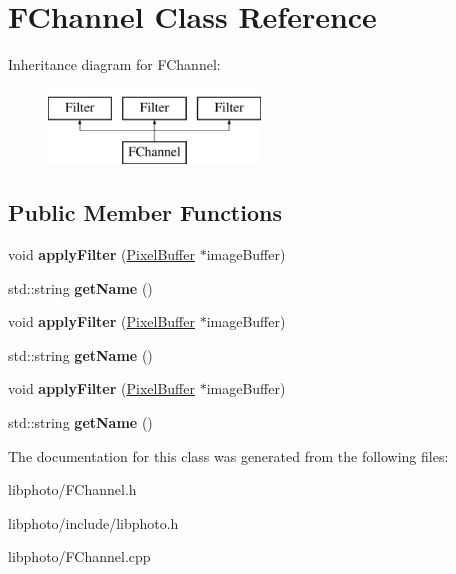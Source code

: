 \hypertarget{classFChannel}{\section{F\-Channel Class Reference}
\label{classFChannel}
}
Inheritance diagram for F\-Channel\-:\begin{figure}[H]
\begin{center}
\leavevmode
\includegraphics[height=2.000000cm]{classFChannel}
\end{center}
\end{figure}
\subsection*{Public Member Functions}
\begin{DoxyCompactItemize}
\item 
\hypertarget{classFChannel_a74a786921c11b3d82119b74f05d3d0c0}{void {\bfseries apply\-Filter} (\hyperlink{classPixelBuffer}{Pixel\-Buffer} $\ast$image\-Buffer)}\label{classFChannel_a74a786921c11b3d82119b74f05d3d0c0}

\item 
\hypertarget{classFChannel_a3d7618565e8643f1a4f87d12a968e406}{std\-::string {\bfseries get\-Name} ()}\label{classFChannel_a3d7618565e8643f1a4f87d12a968e406}

\item 
\hypertarget{classFChannel_a74a786921c11b3d82119b74f05d3d0c0}{void {\bfseries apply\-Filter} (\hyperlink{classPixelBuffer}{Pixel\-Buffer} $\ast$image\-Buffer)}\label{classFChannel_a74a786921c11b3d82119b74f05d3d0c0}

\item 
\hypertarget{classFChannel_a3d7618565e8643f1a4f87d12a968e406}{std\-::string {\bfseries get\-Name} ()}\label{classFChannel_a3d7618565e8643f1a4f87d12a968e406}

\item 
\hypertarget{classFChannel_a74a786921c11b3d82119b74f05d3d0c0}{void {\bfseries apply\-Filter} (\hyperlink{classPixelBuffer}{Pixel\-Buffer} $\ast$image\-Buffer)}\label{classFChannel_a74a786921c11b3d82119b74f05d3d0c0}

\item 
\hypertarget{classFChannel_a3d7618565e8643f1a4f87d12a968e406}{std\-::string {\bfseries get\-Name} ()}\label{classFChannel_a3d7618565e8643f1a4f87d12a968e406}

\end{DoxyCompactItemize}


The documentation for this class was generated from the following files\-:\begin{DoxyCompactItemize}
\item 
libphoto/F\-Channel.\-h\item 
libphoto/include/libphoto.\-h\item 
libphoto/F\-Channel.\-cpp\end{DoxyCompactItemize}
